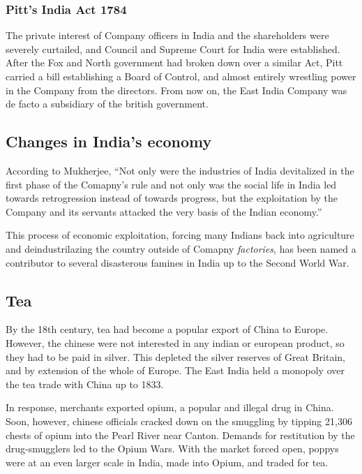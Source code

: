 \documentclass[11pt, a4paper, headings=standardclasses]{scrartcl}
\begin{document}
\subsubsection{Pitt's India Act 1784}

The private interest of Company officers in India and the shareholders were severely curtailed, and Council and Supreme Court for India were established. After the Fox and North government had broken down over a similar Act, Pitt carried a bill establishing a Board of Control, and almost entirely wrestling power in the Company from the directors. From now on, the East India Company was de facto a subsidiary of the british government.\autocite[396]{RF, parliament}

\subsection{Changes in India's economy}
 According to Mukherjee, ``Not only were the industries of India devitalized in the first phase of the Comapny's rule and not only was the social life in India led towards retrogression instead of towards progress, but the exploitation by the Company and its servants attacked the very basis of the Indian economy.''\autocite[335]{RF}
 
This process of economic exploitation, forcing many Indians back into agriculture and deindustrilazing the country outside of Comapny \textit{factories}, has been named a contributor to several disasterous famines in India up to the Second World War.\autocite[Section III]{tnr}

\subsection{Tea}

By the 18th century, tea had become a popular export of China to Europe. However, the chinese were not interested in any indian or european product, so they had to be paid in silver. This depleted the silver reserves of Great Britain, and by extension of the whole of Europe.\autocite[214]{Tea} The East India held a monopoly over the tea trade with China up to 1833\autocite{parliament}.

In response, merchants exported opium, a popular and illegal drug in China.\autocite[215]{Tea} Soon, however, chinese officials cracked down on the smuggling by tipping 21,306 chests of opium into the Pearl River near Canton.\autocite[203]{Tea} Demands for restitution by the drug-smugglers led to the Opium Wars.\autocite{Opium} With the market forced open, poppys were at an even larger scale in India, made into Opium, and traded for tea.\autocite[218-219]{Tea}
\end{document}
